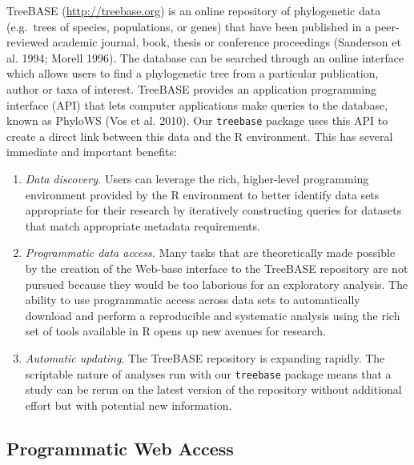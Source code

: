 \documentclass[author-year, 8pt, 3p]{elsarticle} %
\begin{document}
TreeBASE (\href{http://treebase.org}{http://treebase.org}) is an online
repository of phylogenetic data (e.g.~trees of species, populations, or
genes) that have been published in a peer-reviewed academic journal,
book, thesis or conference proceedings (Sanderson et al. 1994; Morell
1996). The database can be searched through an online interface which
allows users to find a phylogenetic tree from a particular publication,
author or taxa of interest. TreeBASE provides an application programming
interface (API) that lets computer applications make queries to the
database, known as PhyloWS (Vos et al. 2010). Our \texttt{treebase}
package uses this API to create a direct link between this data and the
R environment. This has several immediate and important benefits:

\begin{enumerate}[1.]
\item
  \emph{Data discovery.} Users can leverage the rich, higher-level
  programming environment provided by the R environment to better
  identify data sets appropriate for their research by iteratively
  constructing queries for datasets that match appropriate metadata
  requirements.
\item
  \emph{Programmatic data access.} Many tasks that are theoretically
  made possible by the creation of the Web-base interface to the
  TreeBASE repository are not pursued because they would be too
  laborious for an exploratory analysis. The ability to use programmatic
  access across data sets to automatically download and perform a
  reproducible and systematic analysis using the rich set of tools
  available in R opens up new avenues for research.
\item
  \emph{Automatic updating}. The TreeBASE repository is expanding
  rapidly. The scriptable nature of analyses run with our
  \texttt{treebase} package means that a study can be rerun on the
  latest version of the repository without additional effort but with
  potential new information.
\end{enumerate}
\subsection{Programmatic Web Access}
\end{document}

